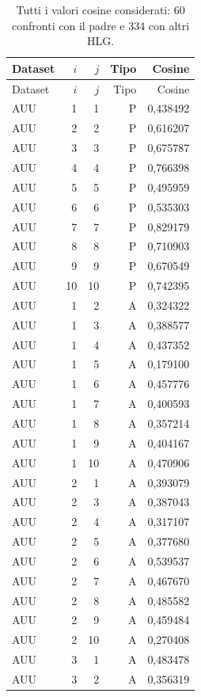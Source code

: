 \begingroup
\small
\setlength{\tabcolsep}{3pt}
\begin{longtable}{lrrrr}
\caption{Tutti i valori cosine considerati: 60 confronti con il padre e 334 con altri HLG.}\label{tab:all-cosine-values}\\
\toprule
Dataset & $i$ & $j$ & Tipo & Cosine \\
\midrule
\endfirsthead
\toprule
Dataset & $i$ & $j$ & Tipo & Cosine \\
\midrule
\endhead
\bottomrule
\endfoot
AUU & 1 & 1 & P & 0,438492 \\
AUU & 2 & 2 & P & 0,616207 \\
AUU & 3 & 3 & P & 0,675787 \\
AUU & 4 & 4 & P & 0,766398 \\
AUU & 5 & 5 & P & 0,495959 \\
AUU & 6 & 6 & P & 0,535303 \\
AUU & 7 & 7 & P & 0,829179 \\
AUU & 8 & 8 & P & 0,710903 \\
AUU & 9 & 9 & P & 0,670549 \\
AUU & 10 & 10 & P & 0,742395 \\
AUU & 1 & 2 & A & 0,324322 \\
AUU & 1 & 3 & A & 0,388577 \\
AUU & 1 & 4 & A & 0,437352 \\
AUU & 1 & 5 & A & 0,179100 \\
AUU & 1 & 6 & A & 0,457776 \\
AUU & 1 & 7 & A & 0,400593 \\
AUU & 1 & 8 & A & 0,357214 \\
AUU & 1 & 9 & A & 0,404167 \\
AUU & 1 & 10 & A & 0,470906 \\
AUU & 2 & 1 & A & 0,393079 \\
AUU & 2 & 3 & A & 0,387043 \\
AUU & 2 & 4 & A & 0,317107 \\
AUU & 2 & 5 & A & 0,377680 \\
AUU & 2 & 6 & A & 0,539537 \\
AUU & 2 & 7 & A & 0,467670 \\
AUU & 2 & 8 & A & 0,485582 \\
AUU & 2 & 9 & A & 0,459484 \\
AUU & 2 & 10 & A & 0,270408 \\
AUU & 3 & 1 & A & 0,483478 \\
AUU & 3 & 2 & A & 0,356319 \\

\end{longtable}
